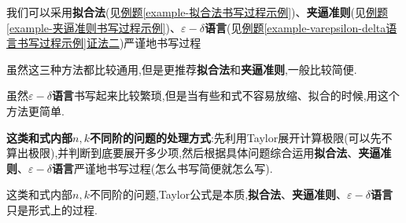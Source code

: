 \documentclass[lang=cn,newtx,10pt,scheme=chinese]{elegantbook}
\begin{document}
我们可以采用\textbf{拟合法}(见\hyperref[example-拟合法书写过程示例]{例题\ref{example-拟合法书写过程示例}})、\textbf{夹逼准则}(见\hyperref[example-夹逼准则书写过程示例]{例题\ref{example-夹逼准则书写过程示例}})、\textbf{$\varepsilon-\delta$语言}(见\hyperref[example-varepsilon-delta语言书写过程示例]{例题\ref{example-varepsilon-delta语言书写过程示例}证法二})严谨地书写过程

\begin{note}
虽然这三种方法都比较通用,但是更推荐\textbf{拟合法}和\textbf{夹逼准则},一般比较简便.

虽然\textbf{$\varepsilon-\delta$语言}书写起来比较繁琐,但是当有些和式不容易放缩、拟合的时候,用这个方法更简单.
\end{note}

\textbf{这类和式内部$n,k$不同阶的问题的处理方式}:先利用Taylor展开计算极限(可以先不算出极限),并判断到底要展开多少项,然后根据具体问题综合运用\textbf{拟合法}、\textbf{夹逼准则}、\textbf{$\varepsilon-\delta$语言}严谨地书写过程(怎么书写简便就怎么写).

\begin{remark}
   这类和式内部$n,k$不同阶的问题,Taylor公式是本质,\textbf{拟合法}、\textbf{夹逼准则}、\textbf{$\varepsilon-\delta$语言}只是形式上的过程.
\end{remark}
\end{document}
